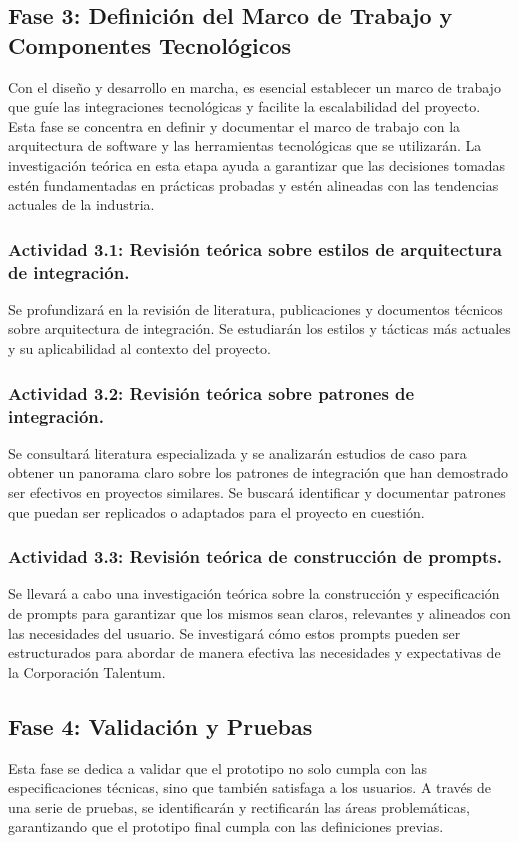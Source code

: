 \subsection{Fase 3: Definición del Marco de Trabajo y Componentes Tecnológicos}
Con el diseño y desarrollo en marcha, es esencial establecer un marco de trabajo que guíe las integraciones tecnológicas y facilite la escalabilidad del proyecto. Esta fase se concentra en definir y documentar el marco de trabajo con la arquitectura de software y las herramientas tecnológicas que se utilizarán. La investigación teórica en esta etapa ayuda a garantizar que las decisiones tomadas estén fundamentadas en prácticas probadas y estén alineadas con las tendencias actuales de la industria.

\subsubsection{Actividad 3.1: Revisión teórica sobre estilos de arquitectura de integración.}
Se profundizará en la revisión de literatura, publicaciones y documentos técnicos sobre arquitectura de integración. Se estudiarán los estilos y tácticas más actuales y su aplicabilidad al contexto del proyecto.

\subsubsection{Actividad 3.2: Revisión teórica sobre patrones de integración.}
Se consultará literatura especializada y se analizarán estudios de caso para obtener un panorama claro sobre los patrones de integración que han demostrado ser efectivos en proyectos similares. Se buscará identificar y documentar patrones que puedan ser replicados o adaptados para el proyecto en cuestión.

\subsubsection{Actividad 3.3: Revisión teórica de construcción de prompts.}
Se llevará a cabo una investigación teórica sobre la construcción y especificación de prompts para garantizar que los mismos sean claros, relevantes y alineados con las necesidades del usuario. Se investigará cómo estos prompts pueden ser estructurados para abordar de manera efectiva las necesidades y expectativas de la Corporación Talentum.

\subsection{Fase 4: Validación y Pruebas}
Esta fase se dedica a validar que el prototipo no solo cumpla con las especificaciones técnicas, sino que también satisfaga a los usuarios. A través de una serie de pruebas, se identificarán y rectificarán las áreas problemáticas, garantizando que el prototipo final cumpla con las definiciones previas.

